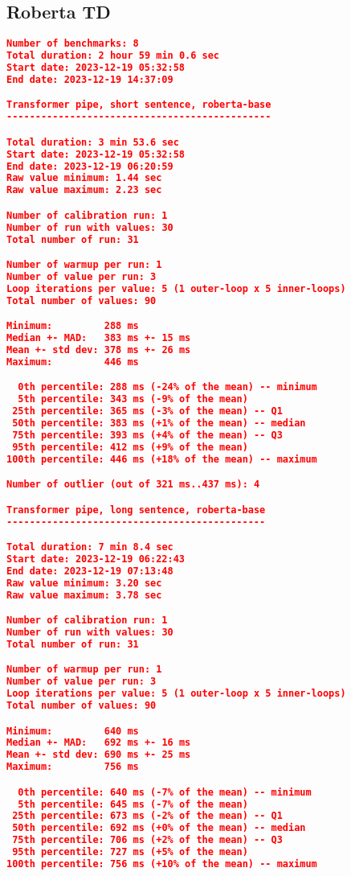 \subsection{Roberta TD}
\begin{lstlisting}[language=json]
Number of benchmarks: 8
Total duration: 2 hour 59 min 0.6 sec
Start date: 2023-12-19 05:32:58
End date: 2023-12-19 14:37:09

Transformer pipe, short sentence, roberta-base
----------------------------------------------

Total duration: 3 min 53.6 sec
Start date: 2023-12-19 05:32:58
End date: 2023-12-19 06:20:59
Raw value minimum: 1.44 sec
Raw value maximum: 2.23 sec

Number of calibration run: 1
Number of run with values: 30
Total number of run: 31

Number of warmup per run: 1
Number of value per run: 3
Loop iterations per value: 5 (1 outer-loop x 5 inner-loops)
Total number of values: 90

Minimum:         288 ms
Median +- MAD:   383 ms +- 15 ms
Mean +- std dev: 378 ms +- 26 ms
Maximum:         446 ms

  0th percentile: 288 ms (-24% of the mean) -- minimum
  5th percentile: 343 ms (-9% of the mean)
 25th percentile: 365 ms (-3% of the mean) -- Q1
 50th percentile: 383 ms (+1% of the mean) -- median
 75th percentile: 393 ms (+4% of the mean) -- Q3
 95th percentile: 412 ms (+9% of the mean)
100th percentile: 446 ms (+18% of the mean) -- maximum

Number of outlier (out of 321 ms..437 ms): 4

Transformer pipe, long sentence, roberta-base
---------------------------------------------

Total duration: 7 min 8.4 sec
Start date: 2023-12-19 06:22:43
End date: 2023-12-19 07:13:48
Raw value minimum: 3.20 sec
Raw value maximum: 3.78 sec

Number of calibration run: 1
Number of run with values: 30
Total number of run: 31

Number of warmup per run: 1
Number of value per run: 3
Loop iterations per value: 5 (1 outer-loop x 5 inner-loops)
Total number of values: 90

Minimum:         640 ms
Median +- MAD:   692 ms +- 16 ms
Mean +- std dev: 690 ms +- 25 ms
Maximum:         756 ms

  0th percentile: 640 ms (-7% of the mean) -- minimum
  5th percentile: 645 ms (-7% of the mean)
 25th percentile: 673 ms (-2% of the mean) -- Q1
 50th percentile: 692 ms (+0% of the mean) -- median
 75th percentile: 706 ms (+2% of the mean) -- Q3
 95th percentile: 727 ms (+5% of the mean)
100th percentile: 756 ms (+10% of the mean) -- maximum


\end{lstlisting}
